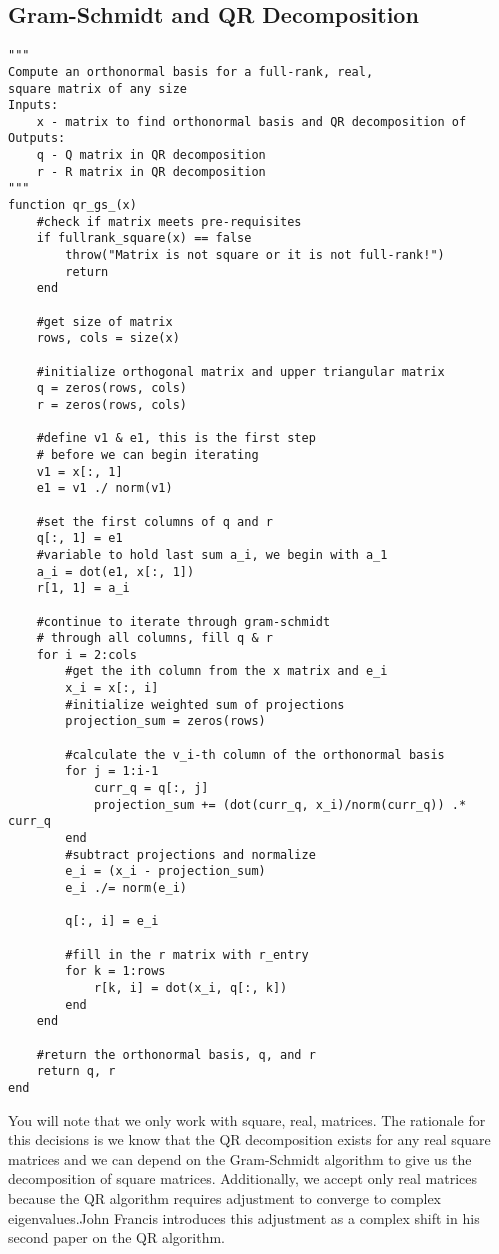\documentclass[onecolumn]{webofc}
\begin{document}
\subsection{Gram-Schmidt and QR Decomposition}
\begin{lstlisting}
"""
Compute an orthonormal basis for a full-rank, real, 
square matrix of any size
Inputs:
    x - matrix to find orthonormal basis and QR decomposition of
Outputs:
    q - Q matrix in QR decomposition
    r - R matrix in QR decomposition
"""
function qr_gs_(x)
    #check if matrix meets pre-requisites
    if fullrank_square(x) == false
        throw("Matrix is not square or it is not full-rank!")
        return
    end

    #get size of matrix
    rows, cols = size(x)

    #initialize orthogonal matrix and upper triangular matrix
    q = zeros(rows, cols)
    r = zeros(rows, cols)

    #define v1 & e1, this is the first step 
    # before we can begin iterating
    v1 = x[:, 1]
    e1 = v1 ./ norm(v1)

    #set the first columns of q and r
    q[:, 1] = e1
    #variable to hold last sum a_i, we begin with a_1
    a_i = dot(e1, x[:, 1]) 
    r[1, 1] = a_i

    #continue to iterate through gram-schmidt 
    # through all columns, fill q & r
    for i = 2:cols
        #get the ith column from the x matrix and e_i
        x_i = x[:, i]
        #initialize weighted sum of projections
        projection_sum = zeros(rows)

        #calculate the v_i-th column of the orthonormal basis
        for j = 1:i-1
            curr_q = q[:, j]
            projection_sum += (dot(curr_q, x_i)/norm(curr_q)) .* curr_q
        end
        #subtract projections and normalize
        e_i = (x_i - projection_sum)
        e_i ./= norm(e_i)

        q[:, i] = e_i

        #fill in the r matrix with r_entry
        for k = 1:rows
            r[k, i] = dot(x_i, q[:, k])
        end
    end

    #return the orthonormal basis, q, and r
    return q, r
end
\end{lstlisting}
You will note that we only work with square, real, matrices. The rationale for this decisions is we know that the QR decomposition exists for any real square matrices and we can depend on the Gram-Schmidt algorithm to give us the decomposition of square matrices. Additionally, we accept only real matrices because the QR algorithm requires adjustment to converge to complex eigenvalues.John Francis introduces this adjustment as a complex shift in his second paper on the QR algorithm.
\end{document}
